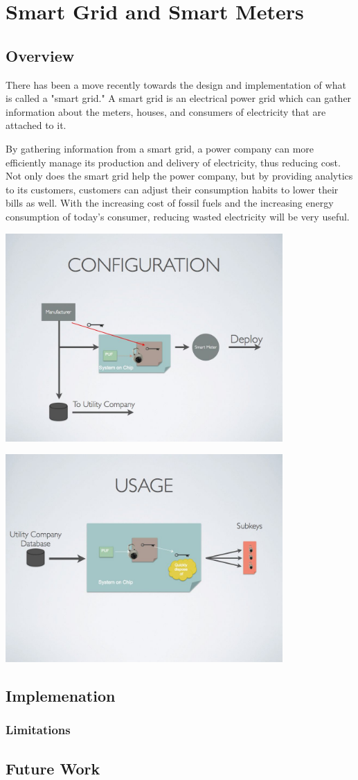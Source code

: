 
\chapter{Smart Grid and Smart Meters}
\label{chapter:doe}

\section{Overview}
There has been a move recently towards the design and implementation of what is called a "smart grid." A smart
grid is an electrical power grid which can gather information about the meters, houses, and consumers of
electricity that are attached to it.

By gathering information from a smart grid, a power company can more efficiently manage its production and delivery
of electricity, thus reducing cost. Not only does the smart grid help the power company, but by providing analytics to
its customers, customers can adjust their consumption habits to lower their bills as well. With the increasing cost of
fossil fuels and the increasing energy consumption of today's consumer, reducing wasted electricity will be very useful.

\includegraphics[width=400px]{images/doe_007.jpg}

\includegraphics[width=400px]{images/doe_008.jpg}

\section{Implemenation}

\subsection{Limitations}

\section{Future Work}